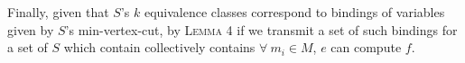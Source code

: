 Finally, given that $S$'s $k$ equivalence classes correspond to  bindings of variables given by $S$'s min-vertex-cut, by \textsc{Lemma 4} if we transmit a set of such bindings for a set of $S$ which contain collectively contains $\forall\ m_i \in M$, $e$ can compute $f$.














